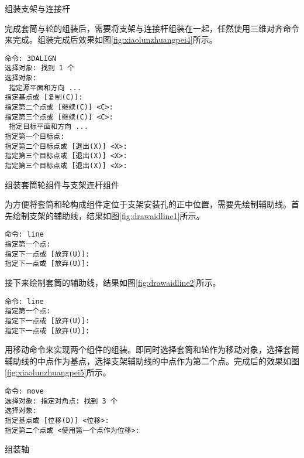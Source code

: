 \begin{procedure}
\item 组装支架与连接杆

完成套筒与轮的组装后，需要将支架与连接杆组装在一起，任然使用三维对齐命令来完成。组装完成后效果如图\ref{fig:xiaolunzhuangpei4}所示。
\begin{lstlisting}
命令: 3DALIGN
选择对象: 找到 1 个
选择对象:
 指定源平面和方向 ...
指定基点或 [复制(C)]:
指定第二个点或 [继续(C)] <C>:
指定第三个点或 [继续(C)] <C>:
 指定目标平面和方向 ...
指定第一个目标点:
指定第二个目标点或 [退出(X)] <X>:
指定第三个目标点或 [退出(X)] <X>:
指定第三个目标点或 [退出(X)] <X>:
\end{lstlisting}

\begin{figure}[htbp]
\centering
\begin{floatrow}[3]
\end{floatrow}
\end{figure}
\item 组装套筒轮组件与支架连杆组件

为方便将套筒和轮构成组件定位于支架安装孔的正中位置，需要先绘制辅助线。首先绘制支架的辅助线，结果如图\ref{fig:drawaidline1}所示。
\begin{lstlisting}
命令: line
指定第一个点:
指定下一点或 [放弃(U)]:
指定下一点或 [放弃(U)]:
\end{lstlisting}

接下来绘制套筒的辅助线，结果如图\ref{fig:drawaidline2}所示。
\begin{lstlisting}
命令: line
指定第一个点:
指定下一点或 [放弃(U)]:
指定下一点或 [放弃(U)]:
\end{lstlisting}

用移动命令来实现两个组件的组装。即同时选择套筒和轮作为移动对象，选择套筒辅助线的中点作为基点，选择支架辅助线的中点作为第二个点。完成后的效果如图\ref{fig:xiaolunzhuangpei5}所示。

\begin{lstlisting}
命令: move
选择对象: 指定对角点: 找到 3 个
选择对象:
指定基点或 [位移(D)] <位移>:
指定第二个点或 <使用第一个点作为位移>:  
\end{lstlisting}
\begin{figure}[htbp]
\begin{floatrow}[2]
\end{floatrow}
\end{figure}
\item 组装轴


\end{procedure}
